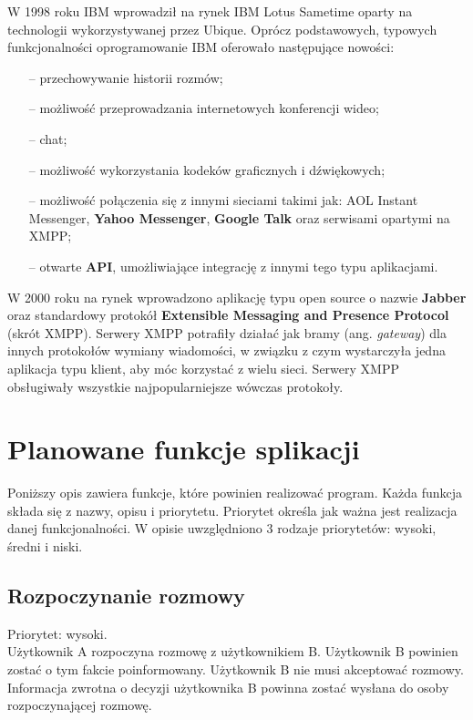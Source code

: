 \documentclass[a4paper,12pt]{article}
\begin{document}
\par W 1998 roku IBM wprowadził na rynek IBM Lotus Sametime oparty na technologii wykorzystywanej przez Ubique. Oprócz podstawowych, typowych funkcjonalności oprogramowanie IBM oferowało następujące nowości:
\begin{itemize}
    \item[--] przechowywanie historii rozmów;
    \item[--] możliwość przeprowadzania internetowych konferencji wideo;
    \item[--] chat;
    \item[--] możliwość wykorzystania kodeków graficznych i dźwiękowych;
    \item[--] możliwość połączenia się z innymi sieciami takimi jak: AOL Instant Messenger, \textbf{Yahoo Messenger}, \textbf{Google Talk} oraz serwisami opartymi na XMPP;
    \item[--] otwarte \textbf{API}, umożliwiające integrację z innymi tego typu aplikacjami.
\end{itemize}

W 2000 roku na rynek wprowadzono aplikację typu open source o nazwie \textbf{Jabber} oraz standardowy protokół \textbf{Extensible Messaging and Presence Protocol} (skrót XMPP). Serwery XMPP potrafiły działać jak bramy (ang. \textit{gateway}) dla innych protokołów wymiany wiadomości, w związku z czym wystarczyła jedna aplikacja typu klient, aby móc korzystać z wielu sieci. Serwery XMPP obsługiwały wszystkie najpopularniejsze wówczas protokoły.



\section[Planowane funkcje aplikacji]{Planowane funkcje splikacji}

Poniższy opis zawiera funkcje, które powinien realizować program. Każda funkcja składa się z nazwy, opisu i priorytetu. Priorytet określa jak ważna jest realizacja danej funkcjonalności. W opisie uwzględniono 3 rodzaje priorytetów: wysoki, średni i niski.
\subsection[Rozpoczynanie rozmowy]{Rozpoczynanie rozmowy}
Priorytet: wysoki.\\

Użytkownik A rozpoczyna rozmowę z użytkownikiem B. Użytkownik B powinien zostać o tym fakcie poinformowany. Użytkownik B nie musi akceptować rozmowy. Informacja zwrotna o decyzji użytkownika B powinna zostać wysłana do osoby rozpoczynającej rozmowę.
\end{document}
